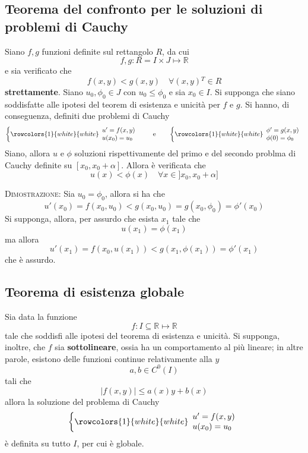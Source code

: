 \documentclass[a4paper]{extarticle}
\begin{document}
\vspace{1em}
\subsection{Teorema del confronto per le soluzioni di problemi di Cauchy}
Siano $f,g$ funzioni definite sul rettangolo $R$, da cui
\[f, g : R = I \times J \longmapsto \mathbb{R}\]
e sia verificato che
\[f(x,y) < g(x,y) \hspace{1em} \forall (x,y){^T} \in R\]
\textbf{strettamente}. Siano $u_0,\phi_0 \in J$ con $u_0 \leq \phi_0$ e sia $x_0 \in I$. Si supponga che siano soddisfatte alle ipotesi del teorem di esistenza e unicità per $f$ e $g$. Si hanno, di conseguenza, definiti due problemi di Cauchy
\[\left\{
    \rowcolors{1}{white}{white}
    \begin{array}{lll}
        u'=f(x,y)\\
        u(x_0)=u_0
    \end{array}
\right. \hspace{2em} \text{e} \hspace{2em} \left\{
    \rowcolors{1}{white}{white}
    \begin{array}{lll}
        \phi'=g(x,y)\\
        \phi(0)=\phi_0
    \end{array}
\right.\]
Siano, allora $u$ e $\phi$ soluzioni rispettivamente del primo e del secondo problma di Cauchy definite su $[x_0,x_0+\alpha]$. Allora è verificata che
\[u(x) < \phi(x) \hspace{1em} \forall x \in ]x_0,x_0+\alpha]\]

\vspace{2em}
\noindent
\normalfont \normalsize
\textsc{Dimostrazione}: Sia $u_0=\phi_0$, allora si ha che 
\[u'(x_0) = f(x_0,u_0) < g(x_0,u_0) = g(x_0,\phi_0) = \phi'(x_0)\]
Si supponga, allora, per assurdo che esista $x_1$ tale che
\[u(x_1) = \phi(x_1)\]
ma allora
\[u'(x_1) = f(x_0,u(x_1)) < g(x_1,\phi(x_1)) = \phi'(x_1)\]
che è assurdo.

\vspace{1em}
\noindent
\subsection{Teorema di esistenza globale}
Sia data la funzione
\[f : I \subseteq \mathbb{R} \longmapsto \mathbb{R}\]
tale che soddisfi alle ipotesi del teorema di esistenza e unicità. Si supponga, inoltre, che $f$ sia \textbf{sottolineare}, ossia ha un comportamento al più lineare; in altre parole, esistono delle funzioni continue relativamente alla $y$
\[a,b \in C^0(I)\]
tali che
\[\left\vert f(x,y) \right\vert \leq a(x)y + b(x)\]
allora la soluzione del problema di Cauchy
\[\left\{
    \rowcolors{1}{white}{white}
    \begin{array}{lll}
        u'=f(x,y)\\
        u(x_0)=u_0
    \end{array}
\right.\]
è definita su tutto $I$, per cui è globale.
\end{document}
